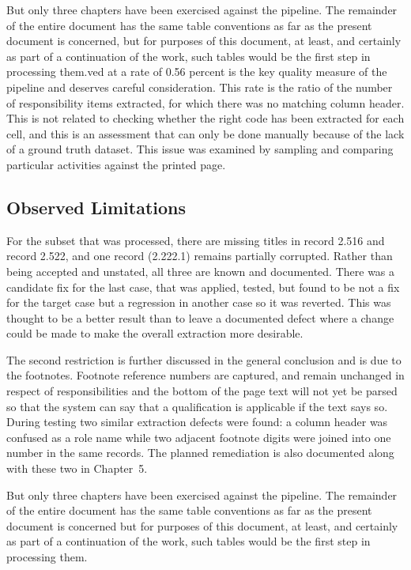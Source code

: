 But only three chapters have been exercised against the pipeline. The remainder of the entire document has the same table conventions as far as the present document is concerned, but for purposes of this document, at least, and certainly as part of a continuation of the work, such tables would be the first step in processing them.ved at a rate of 0.56 percent is the key quality measure of the pipeline and deserves careful consideration. This rate is the ratio of the number of responsibility items extracted, for which there was no matching column header. This is not related to checking whether the right code has been extracted for each cell, and this is an assessment that can only be done manually because of the lack of a ground truth dataset. This issue was examined by sampling and comparing particular activities against the printed page.

\subsection{Observed Limitations}

For the subset that was processed, there are missing titles in record 2.516 and record 2.522, and one record (2.222.1) remains partially corrupted. Rather than being accepted and unstated, all three are known and documented. There was a candidate fix for the last case, that was applied, tested, but found to be not a fix for the target case but a regression in another case so it was reverted. This was thought to be a better result than to leave a documented defect where a change could be made to make the overall extraction more desirable.

The second restriction is further discussed in the general conclusion and is due to the footnotes. Footnote reference numbers are captured, and remain unchanged in respect of responsibilities and the bottom of the page text will not yet be parsed so that the system can say that a qualification is applicable if the text says so. During testing two similar extraction defects were found: a column header was confused as a role name while two adjacent footnote digits were joined into one number in the same records. The planned remediation is also documented along with these two in Chapter~5.

But only three chapters have been exercised against the pipeline. The remainder of the entire document has the same table conventions as far as the present document is concerned but for purposes of this document, at least, and certainly as part of a continuation of the work, such tables would be the first step in processing them.

